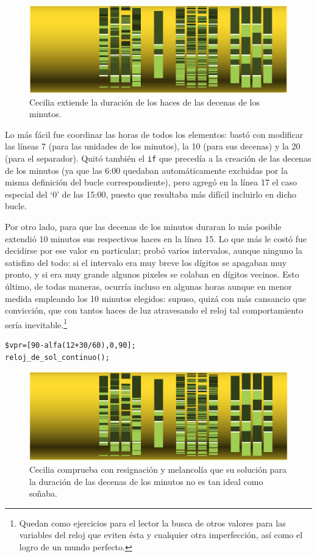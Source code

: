 \begin{figure}[ht]
  \centering
  \includegraphics[width=\textwidth]{imagenes/minutos-bien}  
  \caption{Cecilia extiende la duración de los haces de las decenas de
    los minutos.}
  \label{fig:minutos-bien}
\end{figure}


Lo más fácil fue coordinar las horas de todos los elementos: bastó con
modificar las líneas 7 (para las unidades de los minutos), la 10 (para
sus decenas) y la 20 (para el separador).  Quitó también el
\lstinline!if! que precedía a la creación de las decenas de los
minutos (ya que las 6:00 quedaban automáticamente excluidas por la
misma definición del bucle correspondiente), pero agregó en la línea
17 el caso especial del `0' de las 15:00, puesto que resultaba más
difícil incluirlo en dicho bucle.

Por otro lado, para que las decenas de los minutos duraran lo más
posible extendió 10 minutos sus respectivos haces en la línea 15. Lo
que más le costó fue decidirse por ese valor en particular; probó
varios intervalos, aunque ninguno la satisfizo del todo: si el
intervalo era muy breve los dígitos se apagaban muy pronto, y si era
muy grande algunos pixeles se colaban en dígitos vecinos. Esto último,
de todas maneras, ocurría incluso en algunas horas aunque en menor
medida empleando los 10 minutos elegidos: supuso, quizá con más
cansancio que convicción, que con tantos haces de luz atravesando el
reloj tal comportamiento sería inevitable.\footnote{Quedan como
  ejercicios para el lector la busca de otros valores para las
  variables del reloj que eviten ésta y cualquier otra imperfección,
  así como el logro de un mundo perfecto.}

\begin{lstlisting}
$vpr=[90-alfa(12+30/60),0,90];
reloj_de_sol_continuo();
\end{lstlisting}%


\begin{figure}[ht]
  \centering
  \includegraphics[width=1\textwidth]{imagenes/minutos-imperfectos}  
  \caption{Cecilia comprueba con resignación y melancolía que su
    solución para la duración de las decenas de los minutos no es tan
    ideal como soñaba.}
  \label{fig:minutos-imperfectos}
\end{figure}


